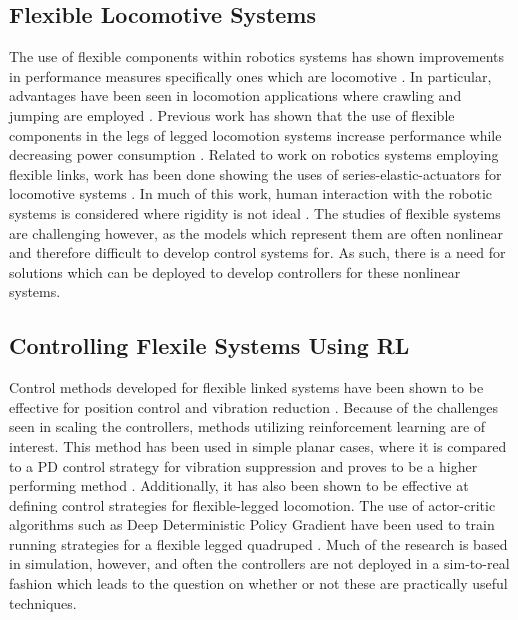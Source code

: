 \documentclass[twocolumn,10pt]{asme2e}
\begin{document}
\subsection{Flexible Locomotive Systems}
\label{sec:flexible_background}
%
The use of flexible components within robotics systems has shown improvements in performance measures specifically ones which are locomotive \cite{Hurst2008}. In particular, advantages have been seen in locomotion applications where crawling and jumping are employed \cite{Sugiyama2004}. Previous work has shown that the use of flexible components in the legs of legged locomotion systems increase performance while decreasing power consumption \cite{Saranli2001}. Related to work on robotics systems employing flexible links, work has been done showing the uses of series-elastic-actuators for locomotive systems \cite{Pratt1995}. In much of this work, human interaction with the robotic systems is considered where rigidity is not ideal \cite{Zhang2019}. The studies of flexible systems are challenging however, as the models which represent them are often nonlinear and therefore difficult to develop control systems for. As such, there is a need for solutions which can be deployed to develop controllers for these nonlinear systems.
	
\subsection{Controlling Flexile Systems Using RL}
\label{sec:control_rl}
%
Control methods developed for flexible linked systems have been shown to be effective for position control and vibration reduction \cite{Luo1993, Ahmadi1997}. Because of the challenges seen in scaling the controllers, methods utilizing reinforcement learning are of interest. This method has been used in simple planar cases, where it is compared to a PD control strategy for vibration suppression and proves to be a higher performing method \cite{He2020f}. Additionally, it has also been shown to be effective at defining control strategies for flexible-legged locomotion. The use of actor-critic algorithms such as Deep Deterministic Policy Gradient \cite{Lillicrap2016h} have been used to train running strategies for a flexible legged quadruped \cite{Dwiel2019d}. Much of the research is based in simulation, however, and often the controllers are not deployed in a sim-to-real fashion which leads to the question on whether or not these are practically useful techniques.
\end{document}
